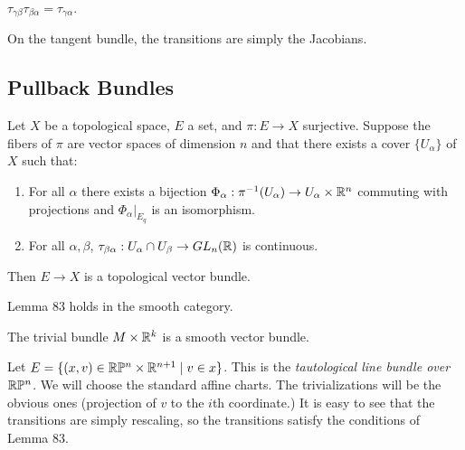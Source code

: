 \documentclass[twoside, 10pt]{article}
\begin{document}
    \begin{prop} $\tau_{\gamma\beta}\tau_{\beta\alpha} = \tau_{\gamma\alpha}$.
    \end{prop}

    \begin{exm} On the tangent bundle, the transitions are simply the
    Jacobians.  \end{exm}

    \subsection{Pullback Bundles}%
    
    

    \begin{lem} Let $X$ be a topological space, $E$ a set, and $\pi:E \to X$
        surjective. Suppose the fibers of $\pi$ are vector spaces of dimension
        $n$ and that there exists a cover $\{U_{\alpha}\}$ of $X$ such that:
        \begin{enumerate} \item For all $\alpha$ there exists a bijection
            $\Phi_{\alpha}:\pi^{-1}(U_{\alpha}) \to U_{\alpha}\times \mathbb{R}^n$
            commuting with projections and $\Phi_{\alpha}|_{E_q}$ is an
            isomorphism.  \item For all $\alpha,\beta$,
    $\tau_{\beta\alpha}:U_{\alpha}\cap U_{\beta} \to GL_n(\mathbb{R})$ is continuous.
    \end{enumerate} Then $E \to X$ is a topological vector bundle.  \end{lem}

    \begin{rmk} Lemma 83 holds in the smooth category.  \end{rmk}

    \begin{exm} The trivial bundle $M \times \mathbb{R}^k$ is a smooth vector bundle.
    \end{exm}

    \begin{exm} Let $E = \{(x,v) \in \mathbb{R}\mathbb{P}^n \times \mathbb{R}^{n+1} \mid v \in x\}$.
        This is the \textit{tautological line bundle over $\mathbb{R}\mathbb{P}^n$.} We will
        choose the standard affine charts. The trivializations will be the
        obvious ones (projection of $v$ to the $i$th coordinate.) It is easy to
        see that the transitions are simply rescaling, so the transitions
        satisfy the conditions of Lemma 83.  \end{exm}
\end{document}
